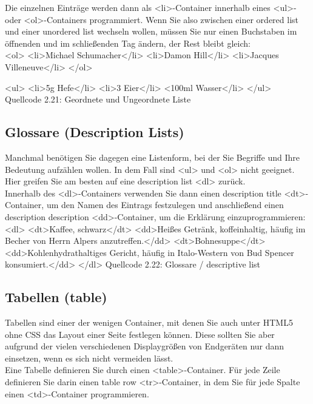 Die einzelnen Einträge werden dann als <li>-Container innerhalb eines <ul>- oder <ol>-Containers programmiert. Wenn Sie also zwischen einer ordered list und einer unordered list wechseln wollen, müssen Sie nur einen Buchstaben im öffnenden und im schließenden Tag ändern, der Rest bleibt gleich:\\

<ol>
<li>Michael Schumacher</li>
<li>Damon Hill</li>
<li>Jacques Villeneuve</li>
</ol>

<ul>
<li>5g Hefe</li>
<li>3 Eier</li>
<100ml Wasser</li>
</ul>
Quellcode 2.21: Geordnete und Ungeordnete Liste

\subsection{Glossare (Description Lists)}

Manchmal benötigen Sie dagegen eine Listenform, bei der Sie Begriffe und Ihre Bedeutung aufzählen wollen. In dem Fall sind <ul> und <ol> nicht geeignet. Hier greifen Sie am besten auf eine description list <dl> zurück.\\

Innerhalb des <dl>-Containers verwenden Sie dann einen description title <dt>-Container, um den Namen des Eintrags festzulegen und anschließend einen description description <dd>-Container, um die Erklärung einzuprogrammieren:\\

<dl>
<dt>Kaffee, schwarz</dt>
<dd>Heißes Getränk, koffeinhaltig, häufig im Becher von Herrn Alpers anzutreffen.</dd>
<dt>Bohnesuppe</dt>
<dd>Kohlenhydrathaltiges Gericht, häufig in Italo-Western von Bud Spencer konsumiert.</dd>
</dl>
Quellcode 2.22: Glossare / descriptive list

\subsection{Tabellen (table)}

Tabellen sind einer der wenigen Container, mit denen Sie auch unter HTML5 ohne CSS das Layout einer Seite festlegen können. Diese sollten Sie aber aufgrund der vielen verschiedenen Displaygrößen von Endgeräten nur dann einsetzen, wenn es sich nicht vermeiden lässt.\\

Eine Tabelle definieren Sie durch einen <table>-Container. Für jede Zeile definieren Sie darin einen table row <tr>-Container, in dem Sie für jede Spalte einen <td>-Container programmieren.\\

